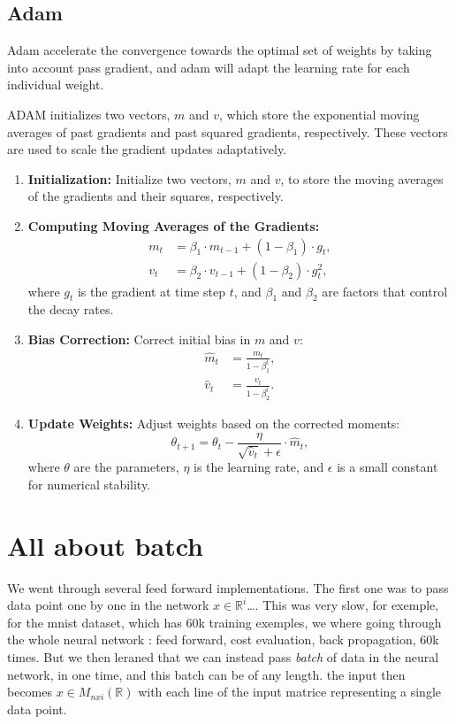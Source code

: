 \documentclass[a4paper, twocolumn, twoside]{article}
\begin{document}
	\subsection{Adam}
	Adam accelerate the convergence towards the optimal set of weights by taking into account pass gradient,
	and adam will adapt the learning rate for each individual weight.

	ADAM initializes two vectors, 
	$m$ and $v$, which store the exponential moving averages of past gradients and past squared gradients,
	respectively. These vectors are used to scale the gradient updates adaptatively.

	\begin{enumerate}
	  \item \textbf{Initialization:} Initialize two vectors, $m$ and $v$, to store the moving averages of the gradients and their squares, respectively.
	  \item \textbf{Computing Moving Averages of the Gradients:}
		\begin{align*}
		  m_t &= \beta_1 \cdot m_{t-1} + (1 - \beta_1) \cdot g_t, \\
		  v_t &= \beta_2 \cdot v_{t-1} + (1 - \beta_2) \cdot g_t^2,
		\end{align*}
		where $g_t$ is the gradient at time step $t$, and $\beta_1$ and $\beta_2$ are factors that control the decay rates.
	  \item \textbf{Bias Correction:} Correct initial bias in $m$ and $v$:
		\begin{align*}
		  \hat{m}_t &= \frac{m_t}{1 - \beta_1^t}, \\
		  \hat{v}_t &= \frac{v_t}{1 - \beta_2^t}.
		\end{align*}
	  \item \textbf{Update Weights:} Adjust weights based on the corrected moments:
		\begin{equation*}
		  \theta_{t+1} = \theta_t - \frac{\eta}{\sqrt{\hat{v}_t} + \epsilon} \cdot \hat{m}_t,
		\end{equation*}
		where $\theta$ are the parameters, $\eta$ is the learning rate, and $\epsilon$ is a small constant for numerical stability.
	\end{enumerate}

	\section{All about batch}
	We went through several feed forward implementations. The first one was to pass data point one by one in the network
	$x \in \mathbb{R}^{i}$\dots. This was very slow, for exemple, for the mnist dataset, which has 60k training exemples,
	we where going through the whole neural network : feed forward, cost evaluation, back propagation, 60k times.
	But we then leraned that we can instead pass \textit{batch} of data in the neural network, in one time, and this batch can
	be of any length.
	the input then becomes $x \in M_{nxi} (\mathbb{R})$ with each line of the input matrice representing a single data point.
\end{document}
